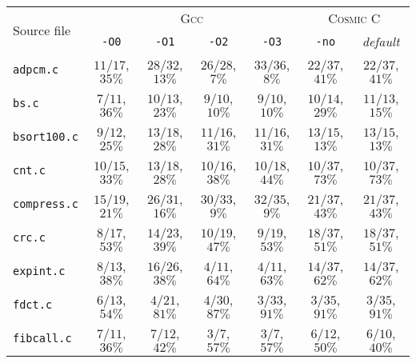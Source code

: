 \begin{tabular}{ |l| |c|c|c|c| |c|c| }
  \hline
  \multirow{2}{*}{Source file}
  & \multicolumn{4}{c||}{\textsc{Gcc}}
  & \multicolumn{2}{c|}{\textsc{Cosmic C}}

  \\\cline{2-7}
  & \multicolumn{1}{c|}{\texttt{-O0}} & \multicolumn{1}{c|}{\texttt{-O1}} & \multicolumn{1}{c|}{\texttt{-O2}} & \multicolumn{1}{c||}{\texttt{-O3}}
  & \multicolumn{1}{c|}{\texttt{-no}} & \multicolumn{1}{c|}{\emph{default}}

  \\\hline\hline
  \verb|adpcm.c|
  & $11/17$, $35\%$ & $28/32$, $13\%$ & $26/28$,\hspace{.5em} $7\%$ & $33/36$,\hspace{.5em} $8\%$
  & $22/37$, $41\%$ & $22/37$, $41\%$
  
  \\\hline
  \verb|bs.c|
  & $7/11$, $36\%$ & $10/13$, $23\%$ & $9/10$, $10\%$ & $9/10$, $10\%$
  & $10/14$, $29\%$ & $11/13$, $15\%$
  
  \\\hline
  \verb|bsort100.c|
  & $9/12$, $25\%$ & $13/18$, $28\%$ & $11/16$, $31\%$ & $11/16$, $31\%$
  & $13/15$, $13\%$ & $13/15$, $13\%$

  \\\hline
  \verb|cnt.c|
  & $10/15$, $33\%$ & $13/18$, $28\%$ & $10/16$, $38\%$ & $10/18$, $44\%$
  & $10/37$, $73\%$ & $10/37$, $73\%$

  \\\hline
  \verb|compress.c|
  & $15/19$, $21\%$ & $26/31$, $16\%$ & $30/33$,\hspace{.5em} $9\%$ & $32/35$,\hspace{.5em} $9\%$
  & $21/37$, $43\%$ & $21/37$, $43\%$

  \\\hline
  \verb|crc.c|
  & $8/17$, $53\%$ & $14/23$, $39\%$ & $10/19$, $47\%$ & $9/19$, $53\%$
  & $18/37$, $51\%$ & $18/37$, $51\%$

  \\\hline
  \verb|expint.c|
  & $8/13$, $38\%$ & $16/26$, $38\%$ & $4/11$, $64\%$ & $4/11$, $63\%$
  & $14/37$, $62\%$ & $14/37$, $62\%$

  \\\hline
  \verb|fdct.c|
  & $6/13$, $54\%$ & $4/21$, $81\%$ & $4/30$, $87\%$ & $3/33$, $91\%$
  & $3/35$, $91\%$ & $3/35$, $91\%$

  \\\hline
  \verb|fibcall.c|
  & $7/11$, $36\%$ & $7/12$, $42\%$ & $3/7$,\hspace{.5em} $57\%$ & $3/7$,\hspace{.5em} $57\%$
  & $6/12$, $50\%$ & $6/10$, $40\%$


\end{tabular}
